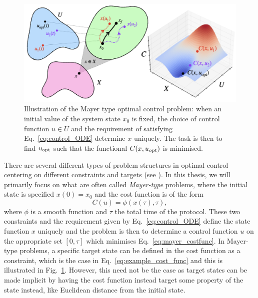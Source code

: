\begin{figure}[t]
\centering
\includegraphics[width=0.9\linewidth]{images/optimal_control_illustration.png} \caption[Illustration of optimal control problem structure]{Illustration of the Mayer type optimal control problem: when an initial value of the system state $x_0$ is fixed, the choice of control function $u \in U$ and the requirement of satisfying Eq.~\eqref{eq:control_ODE} determine $x$ uniquely. The task is then to find $u_{\rm opt}$ such that the functional $C(x, u_{\rm opt})$ is minimised.}\label{fig:optimal_control}
\end{figure}

There are several different types of problem structures in optimal control centering on different constraints and targets (see ). In this thesis, we will primarily focus on what are often called \emph{Mayer-type} problems\cite{dalessandro_introduction_2021}, where the initial state is specified $x(0) = x_0$ and the cost function is of the form
\begin{equation}\label{eq:mayer_costfunc}
    C(u) = \phi(x(\tau), \tau),
\end{equation}
where $\phi$ is a smooth function and $\tau$ the total time of the protocol. These two constraints and the requirement given by Eq.~\eqref{eq:control_ODE} define the state function $x$ uniquely and the problem is then to determine a control function $u$ on the appropriate set $[0, \tau]$ which minimises Eq.~\eqref{eq:mayer_costfunc}. In Mayer-type problems, a specific target state can be defined in the cost function as a constraint, which is the case in Eq.~\eqref{eq:example_cost_func} and this is illustrated in Fig.~\ref{fig:optimal_control}. However, this need not be the case as target states can be made implicit by having the cost function instead target some property of the state instead, like Euclidean distance from the initial state. 

